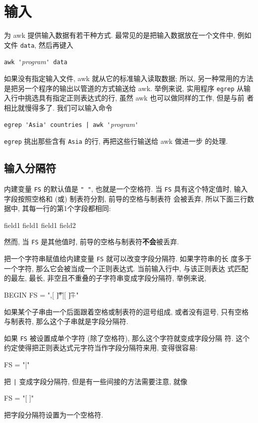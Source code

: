 \section{输入}
\label{sec:input}

为 awk 提供输入数据有若干种方式. 最常见的是把输入数据放在一个文件中, 例如 
文件 \verb'data', 然后再键入
\begin{pattern}
    \indent\verb"awk '"\textit{program}\verb"' data"
\end{pattern}

如果没有指定输入文件, awk 就从它的标准输入读取数据; 所以, 另一种常用的方法
是把另一个程序的输出以管道的方式输送给 awk. 举例来说, 实用程序 \verb'egrep'
从输入行中挑选具有指定正则表达式的行, 虽然 awk 也可以做同样的工作, 但是与前
者相比就慢得多了. 我们可以输入命令
\begin{pattern}
    \indent\verb"egrep 'Asia' countries | awk '"\textit{program}\verb"'"
\end{pattern}
\verb'egrep' 挑出那些含有 \verb'Asia' 的行, 再把这些行输送给 awk 做进一步
的处理.

\subsection{输入分隔符}
\label{subsec:input_separators}

内建变量 \verb'FS' 的默认值是 \verb'" "', 也就是一个空格符. 当 \verb'FS'
具有这个特定值时, 输入字段按照空格和 (或) 制表符分割, 前导的空格与制表符
会被丢弃, 所以下面三行数据中, 其每一行的第1个字段都相同:
\begin{awkcode}
    field1
      field1
        field1      field2
\end{awkcode}
然而, 当 \verb'FS' 是其他值时, 前导的空格与制表符\textbf{不会}被丢弃.

把一个字符串赋值给内建变量 \verb'FS' 就可以改变字段分隔符. 如果字符串的长
度多于一个字符, 那么它会被当成一个正则表达式. 当前输入行中, 与该正则表达
式匹配的最左, 最长, 非空且不重叠的子字符串变成字段分隔符, 举例来说,
\begin{awkcode}
    BEGIN { FS = ",[ \t]*|[ \t]+" }
\end{awkcode}
如果某个子串由一个后面跟着空格或制表符的逗号组成, 或者没有逗号, 只有空格
与制表符, 那么这个子串就是字段分隔符.

如果 \verb'FS' 被设置成单个字符 (除了空格符), 那么这个字符就变成字段分隔
符. 这个约定使得把正则表达式元字符当作字段分隔符来用, 变得很容易:
\begin{awkcode}
    FS = "|"
\end{awkcode}
把 \verb'|' 变成字段分隔符, 但是有一些间接的方法需要注意, 就像 
\begin{awkcode}
    FS = "[ ]"
\end{awkcode}
把字段分隔符设置为一个空格符.

